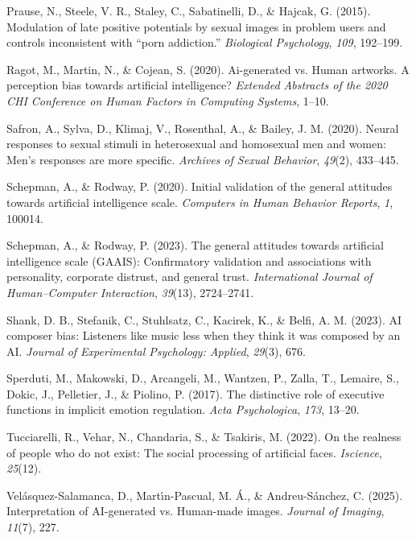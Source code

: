 \documentclass[
  jou,
  floatsintext,
  longtable,
  nolmodern,
  notxfonts,
  notimes,
  colorlinks=true,linkcolor=blue,citecolor=blue,urlcolor=blue]{apa7}
\newlength{\cslhangindent}
\newenvironment{CSLReferences}[2] %
 {\begin{list}{}{%
  \setlength{\itemindent}{0pt}
  \setlength{\leftmargin}{0pt}
  \setlength{\parsep}{0pt}
  \ifodd #1
   \setlength{\leftmargin}{\cslhangindent}
   \setlength{\itemindent}{-1\cslhangindent}
  \fi
  \setlength{\itemsep}{#2\baselineskip}}}
 {\end{list}}
\begin{document}
\begin{CSLReferences}{1}{0}
Prause, N., Steele, V. R., Staley, C., Sabatinelli, D., \& Hajcak, G.
(2015). Modulation of late positive potentials by sexual images in
problem users and controls inconsistent with {``porn addiction.''}
\emph{Biological Psychology}, \emph{109}, 192--199.

Ragot, M., Martin, N., \& Cojean, S. (2020). Ai-generated vs. Human
artworks. A perception bias towards artificial intelligence?
\emph{Extended Abstracts of the 2020 CHI Conference on Human Factors in
Computing Systems}, 1--10.

Safron, A., Sylva, D., Klimaj, V., Rosenthal, A., \& Bailey, J. M.
(2020). Neural responses to sexual stimuli in heterosexual and
homosexual men and women: Men's responses are more specific.
\emph{Archives of Sexual Behavior}, \emph{49}(2), 433--445.

Schepman, A., \& Rodway, P. (2020). Initial validation of the general
attitudes towards artificial intelligence scale. \emph{Computers in
Human Behavior Reports}, \emph{1}, 100014.

Schepman, A., \& Rodway, P. (2023). The general attitudes towards
artificial intelligence scale (GAAIS): Confirmatory validation and
associations with personality, corporate distrust, and general trust.
\emph{International Journal of Human--Computer Interaction},
\emph{39}(13), 2724--2741.

Shank, D. B., Stefanik, C., Stuhlsatz, C., Kacirek, K., \& Belfi, A. M.
(2023). AI composer bias: Listeners like music less when they think it
was composed by an AI. \emph{Journal of Experimental Psychology:
Applied}, \emph{29}(3), 676.

Sperduti, M., Makowski, D., Arcangeli, M., Wantzen, P., Zalla, T.,
Lemaire, S., Dokic, J., Pelletier, J., \& Piolino, P. (2017). The
distinctive role of executive functions in implicit emotion regulation.
\emph{Acta Psychologica}, \emph{173}, 13--20.

Tucciarelli, R., Vehar, N., Chandaria, S., \& Tsakiris, M. (2022). On
the realness of people who do not exist: The social processing of
artificial faces. \emph{Iscience}, \emph{25}(12).

Velásquez-Salamanca, D., Martı́n-Pascual, M. Á., \& Andreu-Sánchez, C.
(2025). Interpretation of AI-generated vs. Human-made images.
\emph{Journal of Imaging}, \emph{11}(7), 227.


\end{CSLReferences}
\end{document}
